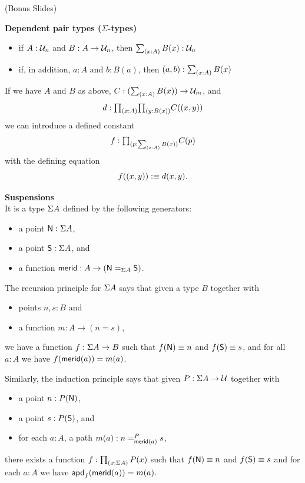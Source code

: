 \documentclass[centering]{report}
\newenvironment{slide}
    {\newpage
    \vspace*{\fill}
    }
    { 
     \vspace*{\fill}
    }
\begin{document}
\begin{slide}
(Bonus Slides)
\end{slide}


\begin{slide}
\label{sigmatype}
\textbf{Dependent pair types (\texorpdfstring{$\Sigma$}{Σ}-types)}\\[2mm]

%
\begin{itemize}
\item if $A:\UU_n$ and $B: A \rightarrow \UU_n$, then $\sm{x:A}B(x) : \UU_n$
\item if, in addition, $a:A$ and $b:B(a)$, then $\tup a b:\sm{x:A}B(x)$
\end{itemize}
%
If we have $A$ and $B$ as above, $C : (\sm{x:A}B(x)) \rightarrow \UU_m$, and
\[
  d:\tprd{x:A}{y:B(x)} C(\tup x y)
\]
we can introduce a defined constant
\[
  f:\tprd{p:\sm{x:A}B(x)} C(p)
\]
with the defining equation
\[
  f(\tup x y)\defeq d(x,y).
\]
\end{slide}

\begin{slide}
\label{suspensions}
\textbf{Suspensions}\\
It is a type $\susp A$ defined by the following generators:

\begin{itemize}
\item a point $\north:\susp A$,
\item a point $\south:\susp A$, and
\item a function $\merid:A \to (\id[\susp A]\north\south)$.
\end{itemize}

The recursion principle for $\susp A$ says that given a 
type $B$ together with
\begin{itemize}
\item points $n,s:B$ and
\item a function $m:A \to (n=s)$,
\end{itemize}
we have a function $f:\susp A \to B$ such that $f(\north)\jdeq n$
and $f(\south)\jdeq s$, and
for all $a:A$ we have $\ap f {\merid(a)} = m(a)$.
%
\end{slide}

\begin{slide}
Similarly, the induction principle says that given
$P:\susp A \to \type$ together with
\begin{itemize}
\item a point $n:P(\north)$,
\item a point $s:P(\south)$, and
\item for each $a:A$, a path $m(a):\dpath P{\merid(a)}ns$,
\end{itemize}
there exists a function $f:\prd{x:\susp A} P(x)$ such that
$f(\north)\jdeq n$ and $f(\south)\jdeq s$ and for each $a:A$
we have $\apd f {\merid(a)} = m(a)$.
\end{slide}
\end{document}
